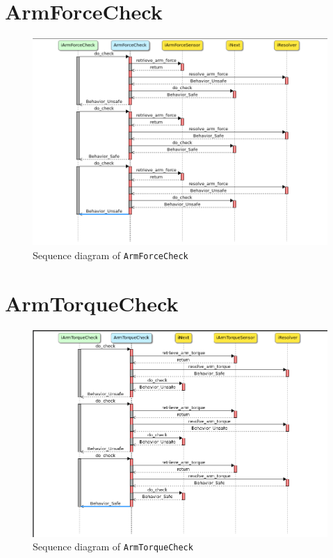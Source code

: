 \documentclass[12pt]{scrreprt}
\begin{document}
\begin{appendices}
\section{ArmForceCheck}
\label{aArmForceCheck}

\begin{figure}[H]
    \centering
    \includegraphics[width=\textwidth]{Figures/results/modelling_figures/ArmForceCheck/ArmForceCheck_seq.png}
    \caption{Sequence diagram of \texttt{ArmForceCheck}}
    \label{fig:ArmForceCheck_seq}
\end{figure}


\section{ArmTorqueCheck}
\label{aArmTorqueCheck}

\begin{figure}[H]
    \centering
    \includegraphics[width=\textwidth]{Figures/results/modelling_figures/ArmTorqueCheck/ArmTorqueCheck_seq.png}
    \caption{Sequence diagram of \texttt{ArmTorqueCheck}}
    \label{fig:ArmTorqueCheck_seq}
\end{figure}




\end{appendices}
\end{document}
